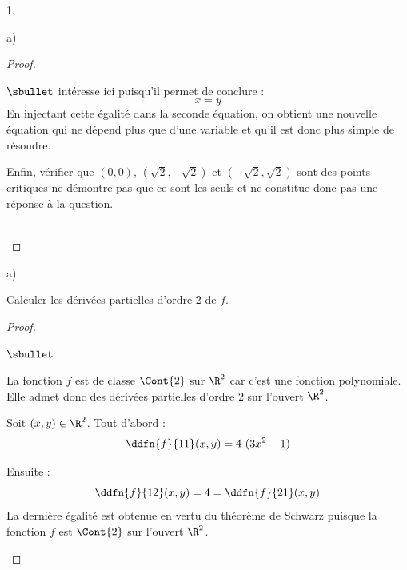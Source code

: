 \documentclass[11pt]{article}%
\begin{document}
\begin{noliste}{1.}
\begin{noliste}{a)}
\begin{proof}
\begin{remark}
\begin{noliste}{$\sbullet$}
          intéresse ici puisqu'il permet de conclure : 
          \[
          x = y
          \]
          En injectant cette égalité dans la seconde équation, on
          obtient une nouvelle équation qui ne dépend plus que d'une
          variable et qu'il est donc plus simple de résoudre.
        \item Enfin, vérifier que $(0,0)$, $(\sqrt{2}, -\sqrt{2})$ et
          $(-\sqrt{2}, \sqrt{2})$ sont des points critiques ne
          démontre pas que ce sont les seuls et ne constitue donc pas
          une réponse à la question.
        \end{noliste}
      \end{remark}~\\[-1.4cm]
    \end{proof}
  \end{noliste}


\newpage


\item
  \begin{noliste}{a)}
    \setlength{\itemsep}{2mm}
  \item Calculer les dérivées partielles d'ordre 2 de $f$.

    \begin{proof}~%
      \begin{noliste}{$\sbullet$}
      \item La fonction $f$ est de classe $\Cont{2}$ sur $\R^2$ car
        c'est une fonction polynomiale. \\
        Elle admet donc des dérivées partielles d'ordre $2$ sur
        l'ouvert $\R^2$. 

      \item Soit $(x, y) \in \R^2$. Tout d'abord :
        \[
        \ddfn{f}{11}(x, y) = 4 \ (3x^2 - 1) 
        \]

      \item Ensuite :
        \[
        \ddfn{f}{12}(x, y) = 4 = \ddfn{f}{21}(x, y)
        \]
        La dernière égalité est obtenue en vertu du théorème de
        Schwarz puisque la fonction $f$ est $\Cont{2}$ sur l'ouvert
        $\R^2$.
        

\end{noliste}
\end{proof}
\end{noliste}
\end{noliste}
\end{document}
